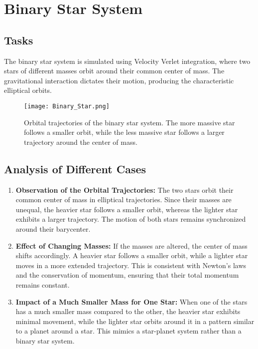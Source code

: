 \documentclass {article}
\begin{document}
\section{Binary Star System}

\subsection{Tasks}
The binary star system is simulated using Velocity Verlet integration, where two stars of different masses orbit around their common center of mass. The gravitational interaction dictates their motion, producing the characteristic elliptical orbits.

\begin{figure}[H]
    \centering
    \texttt{[image: Binary\_Star.png]}
    \caption{Orbital trajectories of the binary star system. The more massive star follows a smaller orbit, while the less massive star follows a larger trajectory around the center of mass.}
    \label{fig:binary_star}
\end{figure}

\subsection{Analysis of Different Cases}
\begin{enumerate}
    \item \textbf{Observation of the Orbital Trajectories:}  
    The two stars orbit their common center of mass in elliptical trajectories. Since their masses are unequal, the heavier star follows a smaller orbit, whereas the lighter star exhibits a larger trajectory. The motion of both stars remains synchronized around their barycenter.

    \item \textbf{Effect of Changing Masses:}  
    If the masses are altered, the center of mass shifts accordingly. A heavier star follows a smaller orbit, while a lighter star moves in a more extended trajectory. This is consistent with Newton's laws and the conservation of momentum, ensuring that their total momentum remains constant.

    \item \textbf{Impact of a Much Smaller Mass for One Star:}  
    When one of the stars has a much smaller mass compared to the other, the heavier star exhibits minimal movement, while the lighter star orbits around it in a pattern similar to a planet around a star. This mimics a star-planet system rather than a binary star system.
\end{enumerate}
\end{document}
